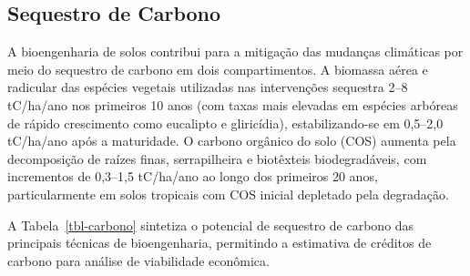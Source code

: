 \documentclass[
  portuguese,
  11pt,
  a4paper,
  open=any]{scrbook}
\begin{document}
\subsection{Sequestro de Carbono}\label{sequestro-de-carbono}

A bioengenharia de solos contribui para a mitigação das mudanças
climáticas por meio do sequestro de carbono em dois compartimentos. A
biomassa aérea e radicular das espécies vegetais utilizadas nas
intervenções sequestra 2--8 tC/ha/ano nos primeiros 10 anos (com taxas
mais elevadas em espécies arbóreas de rápido crescimento como eucalipto
e gliricídia), estabilizando-se em 0,5--2,0 tC/ha/ano após a maturidade.
O carbono orgânico do solo (COS) aumenta pela decomposição de raízes
finas, serrapilheira e biotêxteis biodegradáveis, com incrementos de
0,3--1,5 tC/ha/ano ao longo dos primeiros 20 anos, particularmente em
solos tropicais com COS inicial depletado pela degradação.

A Tabela~\ref{tbl-carbono} sintetiza o potencial de sequestro de carbono
das principais técnicas de bioengenharia, permitindo a estimativa de
créditos de carbono para análise de viabilidade econômica.
\end{document}
